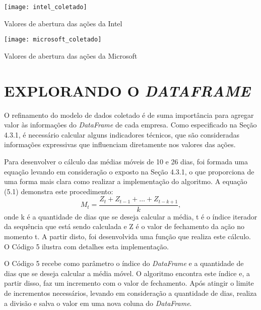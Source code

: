 \begin{grafico}[h]
	\centering
	\centerline{\texttt{[image: intel\_coletado]}}
	\caption{Valores de abertura das ações da Intel}
	\label{exec-intel-coleta}
\end{grafico}

\begin{grafico}[h]
	\centering
	\centerline{\texttt{[image: microsoft\_coletado]}}
	\caption{Valores de abertura das ações da Microsoft}
	\label{exec-microsoft-coleta}
\end{grafico}

\clearpage
\section{EXPLORANDO O \textit{DATAFRAME}}
O refinamento do modelo de dados coletado é de suma importância para agregar valor às informações do \textit{DataFrame} de cada empresa. Como especificado na Seção 4.3.1, é necessário calcular alguns indicadores técnicos, que são consideradas informações expressivas que influenciam diretamente nos valores das ações.

Para desenvolver o cálculo das médias móveis de 10 e 26 dias, foi formada uma equação levando em consideração o exposto na Seção 4.3.1, o que proporciona de uma forma mais clara como realizar a implementação do algoritmo. A equação (5.1) demonstra este procedimento:
\begin{equation}\label{eq:MMS}
M_t = \dfrac{Z_t + Z_{t-1} + \dots + Z_{t-k+1}}{k},
\end{equation}
onde k é a quantidade de dias que se deseja calcular a média, t é o índice iterador da sequência que está sendo calculada e Z é o valor de fechamento da ação no momento t. A partir disto, foi desenvolvida uma função que realiza este cálculo. O Código 5 ilustra com detalhes esta implementação. 


O Código 5 recebe como parâmetro o índice do \textit{DataFrame} e a quantidade de dias que se deseja calcular a média móvel. O algoritmo encontra este índice e, a partir disso, faz um incremento com o valor de fechamento. Após atingir o limite de incrementos necessários, levando em consideração a quantidade de dias, realiza a divisão e salva o valor em uma nova coluna do \textit{DataFrame}.

